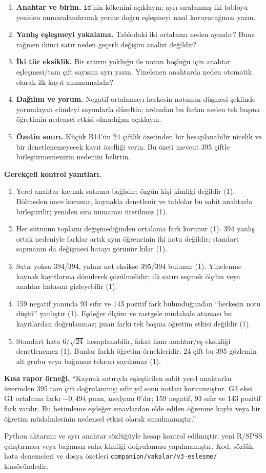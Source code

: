 \begin{enumerate}
\item \textbf{Anahtar ve birim.} \texttt{id}'nin kökenini açıklayın;
ayrı sıralanmış iki tabloyu yeniden numaralandırmak yerine doğru
eşleşmeyi nasıl koruyacağınızı yazın.
\item \textbf{Yanlış eşleşmeyi yakalama.} Tablodaki iki ortalama
neden aynıdır? Buna rağmen ikinci satır neden geçerli değişim
analizi değildir?
\item \textbf{İki tür eksiklik.} Bir satırın yokluğu ile notun
boşluğu için anahtar eşleşmesi/tam çift sayısını ayrı yazın. Yinelenen
anahtarda neden otomatik olarak ilk kayıt alınmamalıdır?
\item \textbf{Dağılım ve yorum.} Negatif ortalamayı herkesin notunun
düşmesi şeklinde yorumlayan cümleyi sayımlarla düzeltin; ardından
bu farkın neden tek başına öğretimin nedensel etkisi olmadığını açıklayın.
\item \textbf{Özetin sınırı.} Küçük B14'ün 24 çiftlik özetinden
bir hesaplanabilir nicelik ve bir denetlenemeyecek kayıt özelliği
verin. Bu özeti mevcut 395 çiftle birleştirmemenizin nedenini belirtin.
\end{enumerate}

\textbf{Gerekçeli kontrol yanıtları.}
\begin{enumerate}
\item Yerel anahtar kaynak satırına bağlıdır; özgün kişi kimliği değildir
(1). Bölmeden önce korunur, kaynakla denetlenir ve tablolar bu sabit
anahtarla birleştirilir; yeniden sıra numarası üretilmez (1).
\item Her sütunun toplamı değişmediğinden ortalama fark korunur (1).
394 yanlış ortak nedeniyle farklar artık aynı öğrencinin iki notu
değildir; standart sapmanın da değişmesi hatayı görünür kılar (1).
\item Satır yoksa 394/394, yalnız not eksikse 395/394 bulunur (1).
Yinelenme kaynak kayıtlarına dönülerek çözülmelidir; ilk satırı seçmek
ölçüm veya anahtar hatasını gizleyebilir (1).
\item 159 negatif yanında 93 sıfır ve 143 pozitif fark bulunduğundan
``herkesin notu düştü'' yanlıştır (1). Eşdeğer ölçüm ve rastgele
müdahale ataması bu kayıtlardan doğrulanmaz; puan farkı tek başına
öğretim etkisi değildir (1).
\item Standart hata $6/\sqrt{24}$ hesaplanabilir, fakat ham
anahtar/eş eksikliği denetlenemez (1). Bunlar farklı öğretim örnekleridir;
24 çift bu 395 gözlemin alt grubu veya bağımsız tekrarı sayılamaz (1).
\end{enumerate}

\textbf{Kısa rapor örneği.} ``Kaynak satırıyla eşleştirilen sabit
yerel anahtarlar üzerinden 395 tam çift doğrulanmış; sıfır yıl sonu
notları korunmuştur. G3 eksi G1 ortalama farkı $-0{,}494$ puan,
medyanı 0'dır; 159 negatif, 93 sıfır ve 143 pozitif fark vardır.
Bu betimleme eşdeğer sınavlardan elde edilen öğrenme kaybı veya
bir öğretim müdahalesinin nedensel etkisi olarak sunulmamıştır.''

Python aktarımı ve ayrı anahtar sözlüğüyle hesap kontrol edilmiştir;
yeni R/SPSS çalıştırması veya bağımsız saha kimliği doğrulaması
yapılmamıştır. Kod, sözlük, hata denemeleri ve dosya özetleri
\nolinkurl{companion/vakalar/v3-eslesme/} klasöründedir.